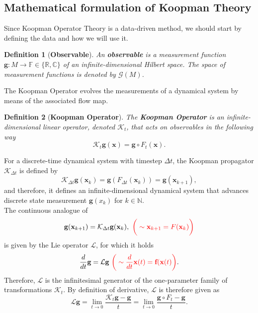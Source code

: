 \documentclass[]{article}
\newtheorem{definition}{Definition}
\begin{document}
\subsection{Mathematical formulation of Koopman Theory}
Since Koopman Operator Theory is a data-driven method, we should start by defining the data and how we will use it.
\begin{definition}[\textbf{Observable}]
An \textbf{observable} is a measurement function $\textbf{g}:M \to \mathbb{F} \in \{\mathbb{R}, \mathbb{C}\}$ of an infinite-dimensional Hilbert space. The space of measurement functions is denoted by $\mathcal{G}(M)$.
\end{definition}
The Koopman Operator evolves the measurements of a dynamical system by means of the associated flow map.
\begin{definition}[\textbf{Koopman Operator}]
The \textbf{Koopman Operator} is an infinite-dimensional linear operator, denoted $\mathcal{K}_t$, that acts on observables in the following way
\begin{equation}
	\mathcal{K}_t \textbf{g}(\textbf{x}) = \textbf{g} \circ F_t (\textbf{x}).
\end{equation}
\end{definition}
For a discrete-time dynamical system with timestep $\Delta t$, the Koopman propagator $\mathcal{K}_{\Delta t}$ is defined by
\begin{equation}
	\mathcal{K}_{\Delta t} \textbf{g}(\textbf{x}_k) = \textbf{g}(F_{\Delta t}(\textbf{x}_k)) = \textbf{g}(\textbf{x}_{k+1}),
\end{equation}
and therefore, it defines an infinite-dimensional dynamical system that advances discrete state measurement $\textbf{g}(x_k)$ for $k \in \mathbb{N}$. \\
The continuous analogue of 
\begin{equation}
	\textbf{g}(\textbf{x}_{k+1}) = \mathcal{K}_{\Delta t} \textbf{g}(\textbf{x}_k), \,\, \text{$\color{red} \bigg(\sim \textbf{x}_{k+1} = F (\textbf{x}_k)\bigg)$}
\end{equation}
is given by the Lie operator $\mathcal{L}$, for which it holds
\begin{equation}
	\frac{d}{dt} \textbf{g} = \mathcal{L} \textbf{g} \,\, \text{$\color{red} \bigg(\sim \frac{d}{dt} \textbf{x}(t) = \textbf{f}(\textbf{x}(t)\bigg)$}.
\end{equation}
Therefore, $\mathcal{L}$ is the infinitesimal generator of the one-parameter family of transformations $\mathcal{K}_t$. By definition of derivative, $\mathcal{L}$ is therefore given as
\begin{equation}
	\mathcal{L}\textbf{g}=\lim_{t \to 0} \frac{\mathcal{K}_t\textbf{g}-\textbf{g}}{t}=\lim_{t \to 0} \frac{\textbf{g} \circ F_t-\textbf{g}}{t}.
\end{equation}
\end{document}
